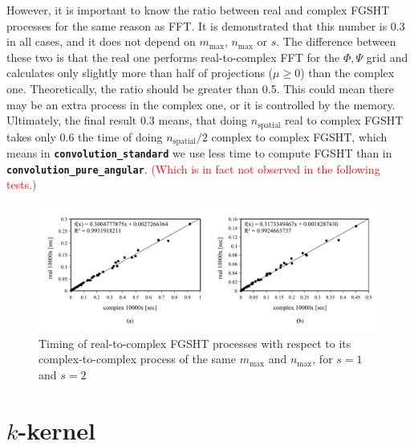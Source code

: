 However, it is important to know the ratio between real and complex
\acs{FGSHT} processes for the same reason as \acs{FFT}. It is demonstrated
that this number is 0.3 in all cases, and it does not depend on $m_{\max}$,
$n_{\max}$ or $s.$ The difference between these two is that the
real one performs real-to-complex \acs{FFT} for the $\Phi,\Psi$
grid and calculates only slightly more than half of projections ($\mu\geq0$)
than the complex one.\textcolor{red}{{} }Theoretically, the ratio should
be greater than 0.5. This could mean there may be an extra process
in the complex one, or it is controlled by the memory. Ultimately,
the final result 0.3 means, that doing $n_{\mathrm{spatial}}$ real
to complex \acs{FGSHT} takes only 0.6 the time of doing $n_{\mathrm{spatial}}/2$
complex to complex \acs{FGSHT}, which means in \texttt{\textbf{convolution\_standard}}
we use less time to compute \acs{FGSHT} than in \texttt{\textbf{convolution\_pure\_angular}}.
\textcolor{red}{(Which is in fact not observed in the following tests.)}
\begin{center}
\begin{figure}[H]
\begin{centering}
\includegraphics[bb=0bp 20bp 680bp 235bp,width=1\columnwidth]{_figure/results/fgsht_real_v_cmplx}
\par\end{centering}
\caption[Timing of real-to-complex \acs{FGSHT} processes with respect to its
complex-to-complex process of the same $m_{\max}$ and $n_{\max}$]{Timing of real-to-complex \acs{FGSHT} processes with respect to
its complex-to-complex process of the same $m_{\max}$ and $n_{\max}$,
for $s=1$ and $s=2$\label{fig:fgsht-real-to-complex}}
\end{figure}
\par\end{center}

\section{$k$-kernel\label{sec:-kernel}}

